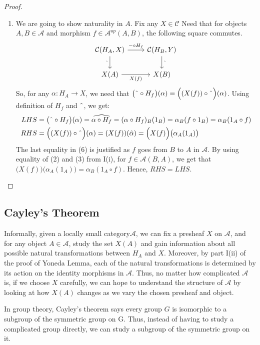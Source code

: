 \documentclass[18pt,a4paper]{article}
\theoremstyle{definition}
\begin{document}
\begin{proof}
\begin{enumerate}[label=\Roman*]
\begin{enumerate}[label=(\roman*)]
	\item We are going to show naturality in $A$. Fix any $X \in \mathcal{C} $ Need that
		for objects $A,B \in \mathcal{A} $ and morphism $f\in \mathcal{A} ^{op}(A,B)$,
		the following square commutes.
		\begin{equation*}
		\begin{tikzcd}
			\mathcal{C}(H_A,X) \arrow[swap]{d}{ \string ^}
			\arrow{r}{- \circ H_f}
			& \mathcal{C}(H_B,Y) \arrow{d}{\string ^}\\
			X(A) \arrow[swap]{r}{X(f)}
			& X(B)
		\end{tikzcd}
		\end{equation*}
		So, for any $\alpha:H_A \to X$, we need that
	$\big( \string ^ \circ H_f \big)(\alpha)=\Big((X(f)) \circ \string ^ \Big)(\alpha) $.
	Using definition of $H_f$ and $\string ^$, we get:
	\begin{align}
		LHS&=\big( \string ^ \circ H_f \big)(\alpha)= \widehat{\alpha \circ H_f}
		=(\alpha \circ H_f)_B (1_B) = \alpha_B (f \circ 1_B) = \alpha_B(1_A \circ f) \\
		RHS&=\Big((X(f)) \circ \string ^ \Big)(\alpha)
		= (X(f))(\hat{\alpha})= \Big(X(f) \Big)\big(\alpha_A(1_A)\big)
	\end{align}
	The last equality in (6) is justified as $f$ goes from $B$ to
	$A$ in $\mathcal{A} $. By using equality of (2) and (3) from I(i), for
	$f \in \mathcal{A}(B,A)$, we get that
	$\Big(X(f) \Big)\big(\alpha_A(1_A)\big)=\alpha_B( 1_A \circ f) $.
	Hence, $RHS=LHS$. \qedhere
\end{enumerate}
	\end{enumerate}
\end{proof}
\subsection{Cayley's Theorem}%
Informally, given a locally small category$\mathcal{A} $, we can fix a presheaf $X$ on $\mathcal{A}$,
and for any object $A \in \mathcal{A} $, study the set $X(A)$ and gain information
about all possible natural transformations between $H_A$ and $X$. Moreover, by part I(ii) of the
proof of Yoneda Lemma, each of the natural transformations is determined by its action
on the identity morphisms in $\mathcal{A}$. Thus, no matter how complicated $\mathcal{A}$ is, if we choose $X$ carefully, we can hope to understand the structure of $\mathcal{A} $
by looking at how $X(A)$ changes as we vary the chosen
presheaf and object.

In group theory, Cayley's theorem says every group $G$ is isomorphic to a subgroup of the symmetric
group on G. Thus, instead of having to study a complicated group directly, we can study a subgroup of
the symmetric group on it.
\end{document}
